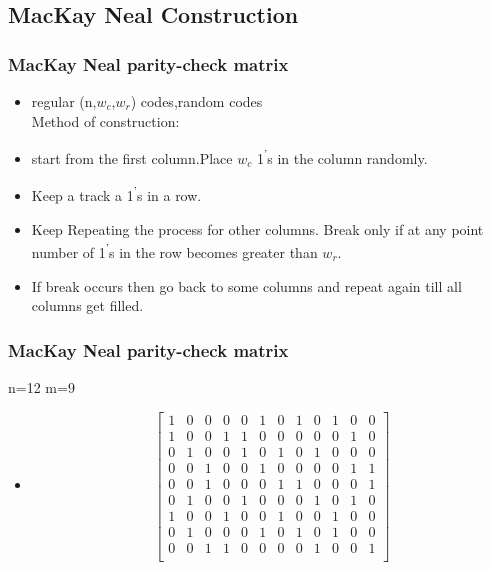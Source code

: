 \documentclass[xcolor=dvipsname]
{beamer}
\begin{document}
\subsection{MacKay Neal Construction}
\begin{frame}[t] 
\frametitle{MacKay Neal parity-check matrix}
\begin{itemize}
\item regular (n,$w_c$,$w_r$) codes,random codes
\\ \alert{Method of construction:}
\item start from the first column.Place $w_c$ 1\textsuperscript{'}s in the column randomly.
\item Keep a track a  1\textsuperscript{'}s in a row.
\item Keep Repeating the process for other columns. Break only if at any point number of 1\textsuperscript{'}s in the row becomes greater than $w_r$.
\item If break occurs then go back to some columns and repeat again till all columns get filled.
\end{itemize}         
\end{frame}
\begin{frame}[t] 
\frametitle{MacKay Neal parity-check matrix}
 n=12 m=9
 \begin{itemize}
 \item  
  \[
 \left[ \begin{array}{cccccccccccc}
1 & 0 & 0 & 0 & 0 & 1 & 0 & 1 & 0 & 1 & 0 & 0 \\
1 & 0 & 0 & 1 & 1 & 0 & 0 & 0 & 0 & 0 & 1 & 0 \\
0 & 1 & 0 & 0 & 1 & 0 & 1 & 0 & 1 & 0 & 0 & 0 \\
0 & 0 & 1 & 0 & 0 & 1 & 0 & 0 & 0 & 0 & 1 & 1 \\
0 & 0 & 1 & 0 & 0 & 0 & 1 & 1 & 0 & 0 & 0 & 1 \\
0 & 1 & 0 & 0 & 1 & 0 & 0 & 0 & 1 & 0 & 1 & 0\\
1 & 0 & 0 & 1 & 0 & 0 & 1 & 0 & 0 & 1 & 0 & 0 \\
0 & 1 & 0 & 0 & 0 & 1 & 0 & 1 & 0 & 1 & 0 & 0 \\
0 & 0 & 1 & 1 & 0 & 0 & 0 & 0 & 1 & 0 & 0 & 1 \\ \end{array} \right]  
\] 

 \end{itemize}
\end{frame} 
\end{document}
